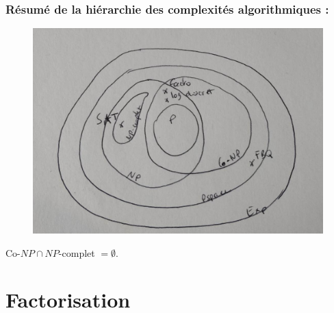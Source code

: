             \subsubsection{Résumé de la hiérarchie des complexités algorithmiques :}
                \begin{figure}[H]
                    \centering
                    \includegraphics[width=.5\textwidth]{pictures/02}
                \end{figure}
                \begin{remq}
                    Co-$NP \cap NP$-complet $= \emptyset$.
                \end{remq}

    \section{Factorisation}
